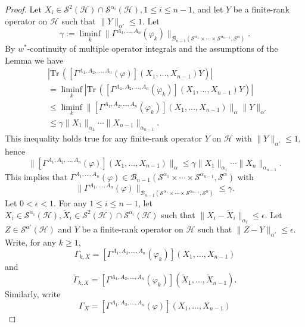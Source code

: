 \documentclass[12pt]{amsart}
\theoremstyle{remark}
\def\tr{{\mathrm{Tr}\,}}
\begin{document}
\begin{proof}
Let $X_i \in \mathcal{S}^2(\mathcal{H}) \cap \mathcal{S}^{\alpha_i}(\mathcal{H}), 1 \leq i \leq n-1$, and let $Y$ be a finite-rank operator on $\mathcal{H}$ such that $\|Y\|_{\alpha'} \leq 1$. Let
$$\gamma := \liminf_k \| \Gamma^{A_1, \ldots, A_n}(\varphi_k)\|_{\mathcal{B}_{n-1}(\mathcal{S}^{\alpha_1} \times \cdots \times \mathcal{S}^{\alpha_{n-1}}, \mathcal{S}^{\alpha})}.$$
By $w^*$-continuity of multiple operator integrals and the assumptions of the Lemma we have
\begin{align*}
& | \tr(\left[\Gamma^{A_1,A_2, \ldots, A_n}(\varphi)\right](X_1,\ldots,X_{n-1})Y)| \\
& = \liminf_k | \tr(\left[\Gamma^{A_1,A_2, \ldots, A_n}(\varphi_k)\right](X_1,\ldots,X_{n-1})Y)| \\
& \leq \liminf_k \| \left[\Gamma^{A_1,A_2, \ldots, A_n}(\varphi_k)\right](X_1,\ldots,X_{n-1}) \|_{\alpha} \|Y\|_{\alpha'} \\
& \leq \gamma \|X_1\|_{\alpha_1} \cdots \|X_{n-1}\|_{\alpha_{n-1}}.
\end{align*}
This inequality holds true for any finite-rank operator $Y$ on $\mathcal{H}$ with $\|Y\|_{\alpha'} \leq 1$, hence
\begin{equation}\label{Proofineqp}
\| \left[\Gamma^{A_1,A_2, \ldots, A_n}(\varphi)\right](X_1,\ldots,X_{n-1}) \|_{\alpha} \leq \gamma \|X_1\|_{\alpha_1} \cdots \|X_n\|_{\alpha_{n-1}}.
\end{equation}
This implies that $\Gamma^{A_1, \ldots, A_n}(\varphi) \in \mathcal{B}_{n-1}(\mathcal{S}^{\alpha_1} \times \cdots \times \mathcal{S}^{\alpha_{n-1}}, \mathcal{S}^{\alpha})$ with
$$
\| \Gamma^{A_1, \ldots, A_n}(\varphi)\|_{\mathcal{B}_{n-1}(\mathcal{S}^{\alpha_1} \times \cdots \times \mathcal{S}^{\alpha_{n-1}}, \mathcal{S}^{\alpha})} \leq \gamma.
$$
Let $0 < \epsilon < 1$. For any $1 \leq i \leq n-1$, let $X_i \in \mathcal{S}^{\alpha_i}(\mathcal{H}), \tilde{X}_i \in \mathcal{S}^2(\mathcal{H}) \cap \mathcal{S}^{\alpha_i}(\mathcal{H})$ such that $\| X_i - \tilde{X}_i \|_{\alpha_i} \leq \epsilon$. Let $Z \in \mathcal{S}^{\alpha'}(\mathcal{H})$ and $Y$ be a finite-rank operator on $\mathcal{H}$ such that $\| Z - Y \|_{\alpha'} \leq \epsilon$. Write, for any $k\geq 1$,
$$\Gamma_{k,X} = \left[\Gamma^{A_1,A_2, \ldots, A_n}(\varphi_k)\right](X_1,\ldots, X_{n-1})$$
and
$$\tilde{\Gamma}_{k,X} = \left[\Gamma^{A_1,A_2, \ldots, A_n}(\varphi_k)\right](\tilde{X}_1, \ldots, \tilde{X}_{n-1}).
$$
Similarly, write
$$\Gamma_{X} = \left[\Gamma^{A_1,A_2, \ldots, A_n}(\varphi)\right](X_1,\ldots,X_{n-1})$$

\end{proof}
\end{document}
